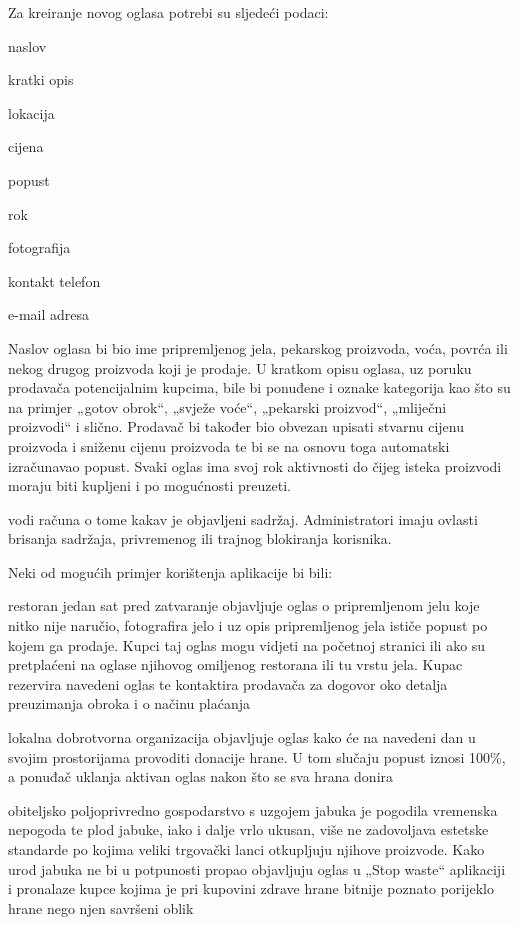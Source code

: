 \noindent Za kreiranje novog oglasa potrebi su sljedeći podaci: 



		\begin{packed_item}
		
		\item  naslov
		\item  kratki opis  
		\item  lokacija
		\item  cijena
		\item popust
		\item rok
		\item fotografija
		\item kontakt telefon 
		\item  e-mail adresa
		
	\end{packed_item}
	
	
	Naslov oglasa bi bio ime pripremljenog jela, pekarskog proizvoda, voća, povrća ili nekog drugog proizvoda koji je prodaje. U kratkom opisu oglasa, uz poruku prodavača potencijalnim kupcima, bile bi ponuđene i oznake kategorija kao što su na primjer „gotov obrok“, „svježe voće“, „pekarski proizvod“, „mliječni proizvodi“ i slično. Prodavač bi također bio obvezan upisati stvarnu cijenu proizvoda i sniženu cijenu proizvoda te bi se na osnovu toga automatski izračunavao popust. Svaki oglas ima svoj rok aktivnosti do čijeg isteka proizvodi moraju biti kupljeni i po mogućnosti preuzeti. 

	\textit{} vodi računa o tome kakav je objavljeni sadržaj. Administratori imaju ovlasti brisanja sadržaja, privremenog ili trajnog blokiranja korisnika. 

\noindent Neki od mogućih primjer korištenja aplikacije bi bili:  

		\begin{packed_item}
			
			\item  restoran jedan sat pred zatvaranje objavljuje oglas o pripremljenom jelu koje nitko nije naručio, fotografira jelo i uz opis pripremljenog jela ističe popust po kojem ga prodaje. Kupci taj oglas mogu vidjeti na početnoj stranici ili ako su pretplaćeni na oglase njihovog omiljenog restorana ili tu vrstu jela. Kupac rezervira navedeni oglas te kontaktira prodavača za dogovor oko detalja preuzimanja obroka i o načinu plaćanja
			\item  lokalna dobrotvorna organizacija objavljuje oglas kako će na navedeni dan u svojim prostorijama provoditi donacije hrane. U tom slučaju popust iznosi 100\%, a ponuđač uklanja aktivan oglas nakon što se sva hrana donira
			\item  obiteljsko poljoprivredno gospodarstvo s uzgojem jabuka je pogodila vremenska nepogoda te plod jabuke, iako i dalje vrlo ukusan, više ne zadovoljava estetske standarde po kojima veliki trgovački lanci otkupljuju njihove proizvode. Kako urod jabuka ne bi u potpunosti propao objavljuju oglas u „Stop waste“ aplikaciji i pronalaze kupce kojima je pri kupovini zdrave hrane bitnije poznato porijeklo hrane nego njen savršeni oblik 
			
		\end{packed_item}
	
